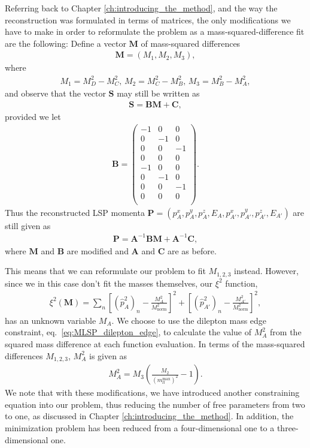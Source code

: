 \documentclass[twoside,english]{uiofysmaster}
\begin{document}
Referring back to Chapter \ref{ch:introducing_the_method}, and the way the reconstruction was formulated in terms of matrices, the only modifications we have to make in order to reformulate the problem as a mass-squared-difference fit are the following: Define a vector $\mathbf{M}$ of mass-squared differences
\begin{align}
	\mathbf{M} = (M_1, M_2, M_3),
\end{align}
where
\begin{align}
	M_1 = M_D^2 - M_C^2, \, M_2 = M_C^2 - M_B^2, \, M_3 = M_B^2 - M_A^2,
\end{align}
and observe that the vector $\mathbf{S}$ may still be written as
\begin{align}
	\mathbf{S} = \mathbf{B}\mathbf{M} + \mathbf{C},
\end{align}
provided we let
\begin{align}
	\mathbf{B} = \begin{pmatrix}
					-1 & 0 & 0 \\
					0 & -1 & 0 \\
					0 & 0 & -1 \\
					0 & 0 & 0 \\
					-1 & 0 & 0  \\
					0 & -1 & 0  \\
					0 & 0 & -1  \\
					0 & 0 & 0 \\
	\end{pmatrix}.
\end{align}
Thus the reconstructed LSP momenta $\mathbf{P} = (p_A^x, p_A^y, p_A^z, E_A, p_{A'}^x, p_{A'}^y, p_{A'}^z, E_{A'})$ are still given as 
\begin{align}
	\mathbf{P} = \mathbf{A}^{-1}\mathbf{B}\mathbf{M} + \mathbf{A}^{-1}\mathbf{C},
\end{align}
where $\mathbf{M}$ and $\mathbf{B}$ are modified and $\mathbf{A}$ and $\mathbf{C}$ are as before.

This means that we can reformulate our problem to fit $M_{1,2,3}$ instead. However, since we in this case don't fit the masses themselves, our $\xi^2$ function,
\begin{align}
	\xi^2(\mathbf{M}) = \sum_n \left[(\hat p_{A}^2)_n - \frac{M_A^2}{M_\mathrm{norm}^2}\right]^2 + \left[(\hat p_{A'}^2)_n - \frac{M_{A'}^2}{M_\mathrm{norm}^2}\right]^2,\label{eq:xisquared_modified_repeat}
\end{align} 
has an unknown variable $M_A$. We choose to use the dilepton mass edge constraint, eq.\ \eqref{eq:MLSP_dilepton_edge}, to calculate the value of $M_A^2$ from the squared mass difference at each function evaluation. In terms of the mass-squared differences $M_{1,2,3}$, $M_A^2$ is given as
\begin{align}
	M_A^2 = M_3\left( \frac{M_2}{(m_{ll}^\mathrm{max})^ 2} - 1 \right).
\end{align}
We note that with these modifications, we have introduced another constraining equation into our problem, thus reducing the number of free parameters from two to one, as discussed in Chapter \ref{ch:introducing_the_method}. In addition, the minimization problem has been reduced from a four-dimensional one to a three-dimensional one. 
\end{document}
